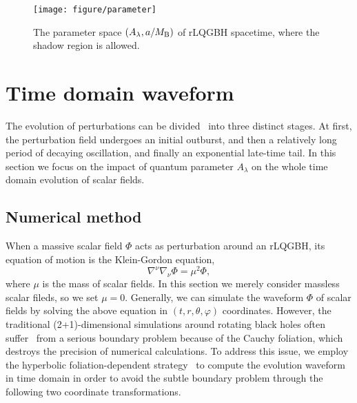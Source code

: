 \documentclass[12pt]{article}
\begin{document}
\begin{figure}[htbp]
		\centering
		\begin{minipage}[t]{0.5\linewidth}
			\centering
			\texttt{[image: figure/parameter]}
		\end{minipage}
		\caption{The parameter space $(A_\lambda, a/M_{\rm B})$ of rLQGBH spacetime, where the shadow region is allowed.}
\label{fig:rLQG_parameter}
	\end{figure}



\section{Time domain waveform}\label{sec:TD}
The evolution of perturbations can be divided~\cite{Konoplya:2011qq} into three distinct stages. At first, the perturbation field undergoes an initial outburst, and then a relatively long period of decaying oscillation, and finally an exponential late-time tail. In this section we focus on the impact of quantum parameter $A_\lambda$ on the whole time domain evolution of scalar fields.
\subsection{Numerical method}\label{subsec:setup_TD}
When a massive scalar field $\Phi$ acts as perturbation around an rLQGBH, its equation of motion is the Klein-Gordon equation,
    \begin{equation}\label{eq_KG}
        \nabla^\nu\nabla_\nu\Phi=\mu^2\Phi,
    \end{equation}
where $\mu$ is the mass of scalar fields. In this section we merely consider massless scalar fileds, so we set $\mu=0$.
Generally, we can simulate the waveform $\Phi$ of scalar fields by solving the above equation in $(t,r,\theta,\varphi)$ coordinates.
However, the traditional (2+1)-dimensional simulations around rotating black holes often suffer~\cite{ThuestadKhannaPrice2017,zhang2020object} from a serious boundary problem because of the Cauchy foliation, which destroys the precision of numerical calculations. 
To address this issue, we employ the hyperbolic foliation-dependent strategy~\cite{Zenginoglu2008a,Zenginoglu2008b,Zenginoglu2008c,Zenginoglu2009,Zenginoglu2009b,Zenginoglu2010,Zenginoglu2011a,Zenginoglu2011b} to compute the evolution waveform in time domain in order to avoid the subtle boundary problem through the following two coordinate transformations.
    
\end{document}
